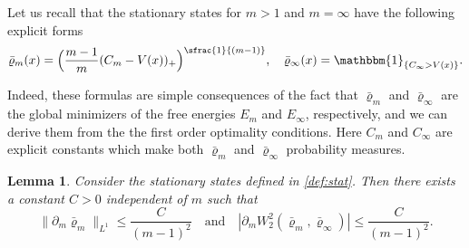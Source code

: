 \documentclass[JEP,XML,SOM,Unicode,published]{cedram}
\newcommand{\spfrac}[2]{\sfrac{#1}{(#2)}}
\let\mathds\mathbbm
\newcommand{\Bprt}[1]{\Bigl(#1\Bigr)}
\theoremstyle{plain}
\newtheorem{lemma}[theorem]{Lemma}
\theoremstyle{remark}
\begin{document}
Let us recall that the stationary states for $m>1$ and $m=\infty$ have the following explicit forms
\begin{equation}\label{def:stat}
\bar\varrho_m(x) = \Bprt{\frac{m-1}{m}(C_m - V(x))_+}^{\spfrac{1}{m-1}}, \quad \bar\varrho_\infty(x)=\mathds{1}_{\{C_\infty > V(x)\}}.
\end{equation}
{Indeed, these formulas are simple consequences of the fact that $\bar\varrho_m$ and $\bar\varrho_{\infty}$ are the global minimizers of the free energies $E_{m}$ and $E_{\infty}$, respectively, and we can derive them from the the first order optimality conditions. Here $C_{m}$ and $C_{\infty}$ are explicit constants which make both $\bar\varrho_m$ and $\bar\varrho_\infty$ probability measures.
\begin{lemma}\label{lem:sec5}
Consider the stationary states defined in \eqref{def:stat}. Then there exists a constant $C>0$ independent of $m$ such that
\[
\|\partial_m \bar\varrho_m\|_{L^1} \leq \frac{C}{(m-1)^2}\quad\text{and}\quad \left| \partial_m W_2^2(\bar\varrho_m, \bar\varrho_\infty)\right| \leq \frac{C}{(m-1)^2}.
\]
\end{lemma}
}
\end{document}

